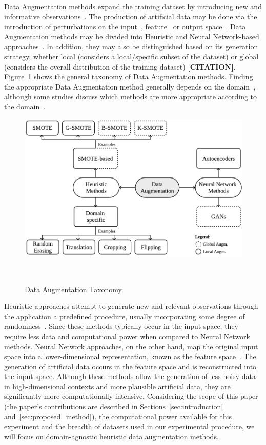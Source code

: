 \documentclass[parskip=full]{scrartcl}
\begin{document}
Data Augmentation methods expand the training dataset by introducing new and
informative observations~\cite{Behpour2019}. The production of artificial data
may be done via the introduction of perturbations on the
input~\cite{Zhong2020}, feature~\cite{DeVries2017} or output
space~\cite{Behpour2019}. Data Augmentation methods may be divided into
Heuristic and Neural Network-based approaches~\cite{Shorten2019}. In addition,
they may also be distinguished based on its generation strategy, whether local
(considers a local/specific subset of the dataset) or global (considers the
overall distribution of the training dataset) \textbf{[CITATION]}.
Figure~\ref{fig:data_augmentation_taxonomy} shows the general taxonomy of Data
Augmentation methods. Finding the appropriate Data Augmentation method
generally depends on the domain~\cite{DeVries2017}, although some studies
discuss which methods are more appropriate according to the
domain~\cite{Shorten2019, Iwana2021, Wong2016}.

\begin{figure}[H]
	\centering
	\includegraphics[width=.8\linewidth]{../analysis/data_augmentation_taxonomy}
    \caption{%
        Data Augmentation Taxonomy.
    }~\label{fig:data_augmentation_taxonomy}
\end{figure}

Heuristic approaches attempt to generate new and relevant observations through
the application a predefined procedure, usually incorporating some degree of
randomness~\cite{Kashefi2020}. Since these methods typically occur in the
input space, they require less data and computational power when compared to
Neural Network methods. Neural Network approaches, on the other hand, map the
original input space into a lower-dimensional representation, known as the
feature space~\cite{DeVries2017}. The generation of artificial data occurs in
the feature space and is reconstructed into the input space. Although these
methods allow the generation of less noisy data in high-dimensional contexts
and more plausible artificial data, they are significantly more
computationally intensive. Considering the scope of this paper (the paper's
contributions are described in Sections~\ref{sec:introduction}
and~\ref{sec:proposed_method}), the computational power available for this
experiment and the breadth of datasets used in our experimental procedure, we
will focus on domain-agnostic heuristic data augmentation methods.
\end{document}
